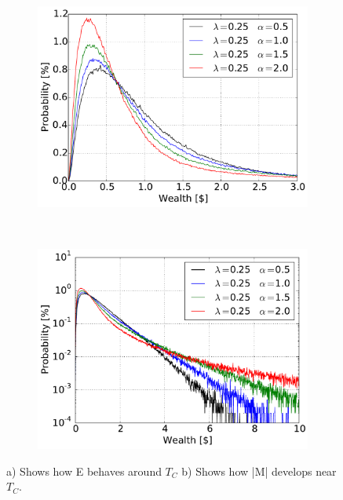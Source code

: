 \begin{figure}[H]
    \centering
    \begin{subfigure}{0.5\textwidth}
        \centering
        \includegraphics[width=\linewidth]{result/bilder/5d-25}
        \caption{}
    \end{subfigure}%
    ~ 
    \begin{subfigure}{0.5\textwidth}
        \centering
        \includegraphics[width=\linewidth]{result/bilder/5d-25-log}
        \caption{}
    \end{subfigure}
    \caption{a) Shows how E behaves around $T_C$ b) Shows how |M| develops near $T_C$.}
    \label{fig:5d-25}
\end{figure}




